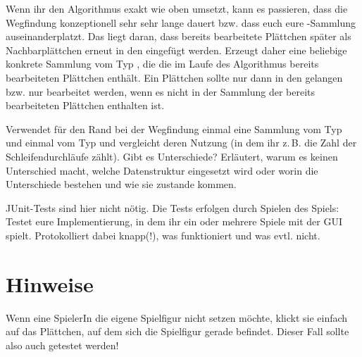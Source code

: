 \documentclass{pi-aufgabenblatt}
\newcommand{\zB}{\mbox{z.\,B.}\xspace}
\newcommand{\bzW}{\mbox{bzw.}\xspace}
\begin{document}
Wenn ihr den Algorithmus exakt wie oben umsetzt, kann es passieren, dass die Wegfindung konzeptionell sehr sehr lange dauert \bzW dass euch eure 
-Sammlung auseinanderplatzt. Das liegt daran, dass bereits bearbeitete Plättchen später als Nachbarplättchen erneut in den 
eingefügt werden. Erzeugt daher eine beliebige konkrete Sammlung vom Typ , die die im Laufe des Algorithmus bereits bearbeiteten 
Plättchen enthält. Ein Plättchen sollte nur dann in den  gelangen \bzW nur bearbeitet werden, wenn es nicht in der Sammlung der bereits
bearbeiteten Plättchen enthalten ist.

Verwendet für den Rand bei der Wegfindung einmal eine Sammlung vom Typ  und einmal vom Typ  und 
vergleicht deren Nutzung (in dem ihr \zB die Zahl der Schleifendurchläufe zählt). Gibt es Unterschiede? Erläutert, 
warum es keinen Unterschied macht, welche Datenstruktur eingesetzt wird oder worin die Unterschiede bestehen und wie 
sie zustande kommen.

JUnit-Tests sind hier nicht nötig. Die Tests erfolgen durch Spielen des Spiels: Testet eure Implementierung, in dem ihr ein
oder mehrere Spiele mit der GUI spielt. Protokolliert dabei knapp(!), was funktioniert und was evtl. nicht.

\section*{Hinweise}
Wenn eine SpielerIn die eigene Spielfigur nicht setzen möchte, klickt sie einfach auf das Plättchen, auf dem sich die 
Spielfigur gerade befindet. Dieser Fall sollte also auch getestet werden!
\end{document}
